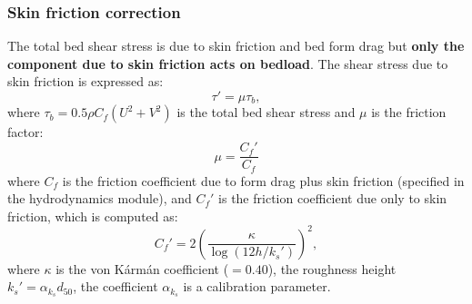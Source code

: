\subsubsection{Skin friction correction}\label{sec:skin}
The total bed shear stress is due to skin friction and bed form drag but \textbf{only the component due to skin friction acts on bedload}. The shear stress due to skin friction is expressed as:
\begin{equation}\label{eq:taup}
\tau'=\mu\tau_b,
\end{equation}
where $\tau_b = 0.5 \rho C_f (U^2 + V^2)$ is the total bed shear stress and $\mu$ is the friction factor:
\begin{equation}\label{eq:mu}
\mu=\frac{C_f'}{C_f}
\end{equation}
where $C_f$ is the friction coefficient due to form drag plus skin friction (specified in the hydrodynamics module), and $C_f'$ is the friction coefficient due only to skin friction, which is computed as:
\begin{equation}\label{eq:cfp}
C_f'=2\left(\frac{\kappa}{\log(12h/k_s')}\right)^2,
\end{equation}
where $\kappa$ is the von K\'arm\'an coefficient ($=0.40$), the roughness height $k_s'=\alpha_{k_s}d_{50}$, the coefficient $\alpha_{k_s}$ is a calibration parameter.


